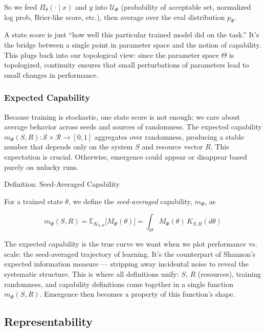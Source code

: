 \documentclass[12pt]{article}
\begin{document}
So we feed $\Pi_\theta(\cdot\mid x)$ and $y$ into $\mathcal U_\Phi$ (probability of acceptable set, normalized log prob, Brier-like score, etc.), then average over the eval distribution $p_\Phi$.

A state score is just “how well this particular trained model did on the task.” It’s the bridge between a single point in parameter space and the notion of capability. This plugs back into our topological view: since the parameter space $\Theta$ is topologized, continuity ensures that small perturbations of parameters lead to small changes in performance.

\subsubsection{Expected Capability}

Because training is stochastic, one state score is not enough: we care about average behavior across seeds and sources of randomness. The expected capability $m_\Phi(S,R):\mathcal S \times \mathcal R \to [0,1]$ aggregates over randomness, producing a stable number that depends only on the system $S$ and resource vector $R$. This expectation is crucial. Otherwise, emergence could appear or disappear based purely on unlucky runs.

\begin{statementbox}{Definition: Seed-Averaged Capability}

For a trained state $\theta$, we define the \textit{seed-averaged} capability, $m_\Phi$, as

\[
m_\Phi(S,R)=\mathbb E_{K_{S,R}}\!\big[M_\Phi(\theta)\big]
=\int_\Theta M_\Phi(\theta)\,K_{S,R}(d\theta)
\]

\end{statementbox}

The expected capability is the true curve we want when we plot performance vs. scale: the seed-averaged trajectory of learning. It’s the counterpart of Shannon’s expected information measure — stripping away incidental noise to reveal the systematic structure. This is where all definitions unify: $S$, $R$  (resources), training randomness, and capability definitions come together in a single function $m_\Phi(S,R)$. Emergence then becomes a property of this function’s shape.

\subsection{Representability}
\end{document}
